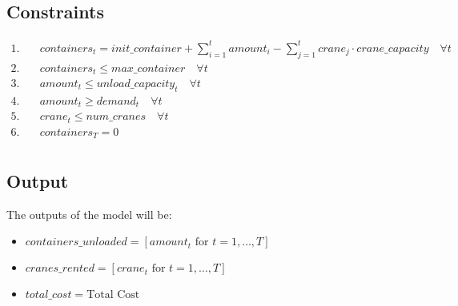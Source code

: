 \documentclass{article}
\begin{document}
\subsection*{Constraints}
\begin{align}
1. & \quad containers_{t} = init\_container + \sum_{i=1}^{t} amount_{i} - \sum_{j=1}^{t} crane_{j} \cdot crane\_capacity \quad \forall t \\
2. & \quad containers_{t} \leq max\_container \quad \forall t \\
3. & \quad amount_{t} \leq unload\_capacity_{t}  \quad \forall t \\
4. & \quad amount_{t} \geq demand_{t} \quad \forall t \\
5. & \quad crane_{t} \leq num\_cranes \quad \forall t \\
6. & \quad containers_{T} = 0 \\ 
\end{align}

\subsection*{Output}
The outputs of the model will be:
\begin{itemize}
    \item $containers\_unloaded = [amount_{t} \text{ for } t=1,\ldots,T]$
    \item $cranes\_rented = [crane_{t} \text{ for } t=1,\ldots,T]$
    \item $total\_cost = \text{Total Cost}$
\end{itemize}
\end{document}
